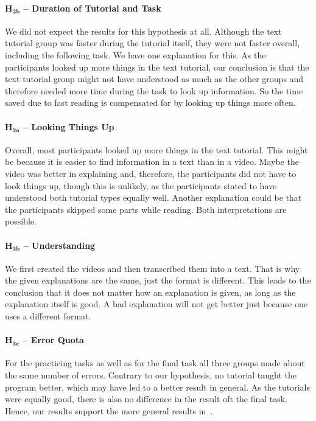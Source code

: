 \paragraph{$\mathbf{H_{2b}}$ -- Duration of Tutorial and Task}
We did not expect the results for this hypothesis at all. Although the text tutorial group was faster during the tutorial itself, they were not faster overall, including the following task. We have one explanation for this. As the participants looked up more things in the text tutorial, our conclusion is that the text tutorial group might not have understood as much as the other groups and therefore needed more time during the task to look up information. So the time saved due to fast reading is compensated for by looking up things more often. 


\paragraph{$\mathbf{H_{3a}}$ -- Looking Things Up}
Overall, most participants looked up more things in the text tutorial. This might be because it is easier to find information in a text than in a video. Maybe the video was better in explaining and, therefore, the participants did not have to look things up, though this is unlikely, as the participants stated to have understood both tutorial types equally well. Another explanation could be that the participants skipped some parts while reading. Both interpretations are possible. 


\paragraph{$\mathbf{H_{3b}}$ -- Understanding}
 We first created the videos and then transcribed them into a text. That is why the given explanations are the same, just the format is different. This leads to the conclusion that it does not matter how an explanation is given, as long as the explanation itself is good. A bad explanation will not get better just because one uses a different format. 


\paragraph{$\mathbf{H_{3c}}$ -- Error Quota}
For the practicing tasks as well as for the final task all three groups made about the same number of errors. Contrary to our hypothesis, no tutorial taught the program better, which may have led to a better result in general. As the tutorials were equally good, there is also no difference in the result oft the final task. Hence, our results support the more general results in~\cite{payne, alexander, deVaney}. 

